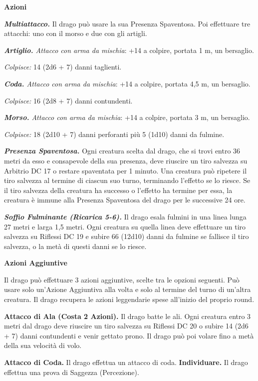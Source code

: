 \begin{multicols}{2}
\smallskip\textbf{Azioni}

\emph{\textbf{Multiattacco.}} Il drago può usare la sua Presenza
Spaventosa. Poi effettuare tre attacchi: uno con il morso e due con gli
artigli.

\emph{\textbf{Artiglio.} Attacco con arma da mischia}: +14 a colpire,
portata 1 m, un bersaglio.

\emph{Colpisce:} 14 (2d6 + 7) danni taglienti.

\emph{\textbf{Coda.} Attacco con arma da mischia}: +14 a colpire,
portata 4,5 m, un bersaglio.

\emph{Colpisce:} 16 (2d8 + 7) danni contundenti.

\emph{\textbf{Morso.} Attacco con arma da mischia}: +14 a colpire,
portata 3 m, un bersaglio.

\emph{Colpisce:} 18 (2d10 + 7) danni perforanti più 5 (1d10) danni da
fulmine.

\emph{\textbf{Presenza Spaventosa.}} Ogni creatura scelta dal drago, che
si trovi entro 36 metri da esso e consapevole della sua presenza, deve
riuscire un tiro salvezza su Arbitrio DC 17 o restare spaventata per 1
minuto. Una creatura può ripetere il tiro salvezza al termine di ciascun
suo turno, terminando l'effetto se lo riesce. Se il tiro salvezza della
creatura ha successo o l'effetto ha termine per essa, la creatura è
immune alla Presenza Spaventosa del drago per le successive 24 ore.

\emph{\textbf{Soffio Fulminante (Ricarica 5-6).}} Il drago esala fulmini
in una linea lunga 27 metri e larga 1,5 metri. Ogni creatura su quella
linea deve effettuare un tiro salvezza su Riflessi DC 19 e subire 66
(12d10) danni da fulmine se fallisce il tiro salvezza, o la metà di
questi danni se lo riesce.

\textbf{Azioni Aggiuntive}

Il drago può effettuare 3 azioni aggiuntive, scelte tra le opzioni
seguenti. Può usare solo un'Azione Aggiuntiva alla volta e solo al
termine del turno di un'altra creatura. Il drago recupera le azioni
leggendarie spese all'inizio del proprio round.

\textbf{Attacco di Ala (Costa 2 Azioni).} Il drago batte le ali. Ogni
creatura entro 3 metri dal drago deve riuscire un tiro salvezza su Riflessi DC 20 o subire 14 (2d6 + 7) danni contundenti e venir gettato
prono. Il drago può poi volare fino a metà della sua velocità di volo.

\textbf{Attacco di Coda.} Il drago effettua un attacco di coda.
\textbf{Individuare.} Il drago effettua una prova di Saggezza
(Percezione).


\end{multicols}
